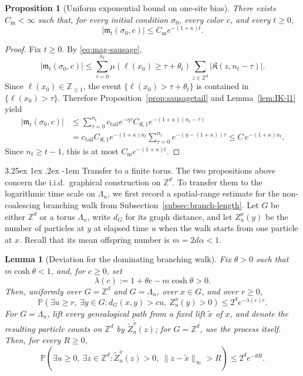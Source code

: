 \documentclass[letterpaper,11pt,reqno]{amsart}
\makeatletter
\newtheorem{lemma}[thm]{Lemma}
\newtheorem{prop}[thm]{Proposition}
\theoremstyle{definition}
\newcommand{\IK}{\mathfrak{K}}
\renewcommand\paragraph{\@startsection{paragraph}{4}{\z@}%
  {3.25ex \@plus1ex \@minus.2ex}%
  {-1em}%
  {\normalfont\normalsize\bfseries}}
\makeatother
\begin{document}
\begin{prop}[Uniform exponential bound on one-site bias]\label{prop:magnetization-bound}
There exists \(C_{\mathrm m}<\infty\) such that, for every initial condition
\(\sigma_0\), every color \(c\), and every \(t\ge0\),
\[
    |\mathfrak m_t(\sigma_0,c)|
    \le
    C_{\mathrm m}e^{-(1+\kappa)t}.
\]
\end{prop}


\begin{proof}
Fix \(t\ge0\). By \eqref{eq:mag-sausage},
\[
|\mathfrak m_t(\sigma_0,c)|
\le
\sum_{\tau=0}^{n_t}\mu(\ell(x_0)\ge \tau+\theta_t)\sum_{z\in\mathbb Z^d}|\IK(z,n_t-\tau)|.
\]
Since \(\ell(x_0)\in\mathbb Z_{\ge1}\), the event \(\{\ell(x_0)>\tau+\theta_t\}\) is contained in
\(\{\ell(x_0)>\tau\}\). Therefore Proposition~\ref{prop:sausagetail} and Lemma~\ref{lem:IK-l1}
yield
\begin{align*}
|\mathfrak m_t(\sigma_0,c)|
&\le
\sum_{\tau=0}^{n_t}c_{\mathrm{tail}}e^{-\eta\tau}C_{\IK,1}e^{-(1+\kappa)(n_t-\tau)}\\
&=
c_{\mathrm{tail}}C_{\IK,1}e^{-(1+\kappa)n_t}
\sum_{\tau=0}^{n_t}e^{-(\eta-(1+\kappa))\tau}
\le
C\,e^{-(1+\kappa)n_t}.
\end{align*}
Since \(n_t\ge t-1\), this is at most \(C_{\mathrm m}e^{-(1+\kappa)t}\).
\end{proof}





\paragraph{Transfer to a finite torus.}
The two propositions above concern the i.i.d.\ graphical construction on
\(\mathbb Z^d\). To transfer them to the logarithmic time scale on
\(\Lambda_n\), we first record a spatial-range estimate for the non-coalescing
branching walk from Subsection~\ref{subsec:branch-length}. Let \(G\) be either
\(\mathbb Z^d\) or a torus \(\Lambda_n\), write \(d_G\) for its graph distance,
and let \(Z_u^x(y)\) be the number of particles at \(y\) at elapsed time \(u\)
when the walk starts from one particle at \(x\). Recall that its mean offspring
number is \(m=2d\alpha<1\).

\begin{lemma}[Deviation for the dominating branching walk]
\label{lem:brw-deviation}
Fix \(\theta>0\) such that \(m\cosh\theta<1\), and, for \(c\ge0\), set
\[
        \lambda(c):=1+\theta c-m\cosh\theta>0.
\]
Then, uniformly over \(G=\mathbb Z^d\) and \(G=\Lambda_n\), over \(x\in G\), and over
\(r\ge0\),
\[
\mathbb P\left(
    \exists u\ge r,\ \exists y\in G:
    d_G(x,y)>cu,\ Z_u^x(y)>0
\right)
\le
2^d e^{-\lambda(c)r}.
\]
For \(G=\Lambda_n\), lift every genealogical path from a fixed lift
\(\tilde x\) of \(x\), and denote the resulting particle counts on
\(\mathbb Z^d\) by \(\widetilde Z_u^{\tilde x}(z)\); for
\(G=\mathbb Z^d\), use the process itself. Then, for every \(R\ge0\),
\[
\mathbb P\left(
    \exists u\ge0,\ \exists z\in\mathbb Z^d:
    \widetilde Z_u^{\tilde x}(z)>0,\
    \|z-\tilde x\|_\infty>R
\right)
\le
2^d e^{-\theta R}.
\]
\end{lemma}
\end{document}
